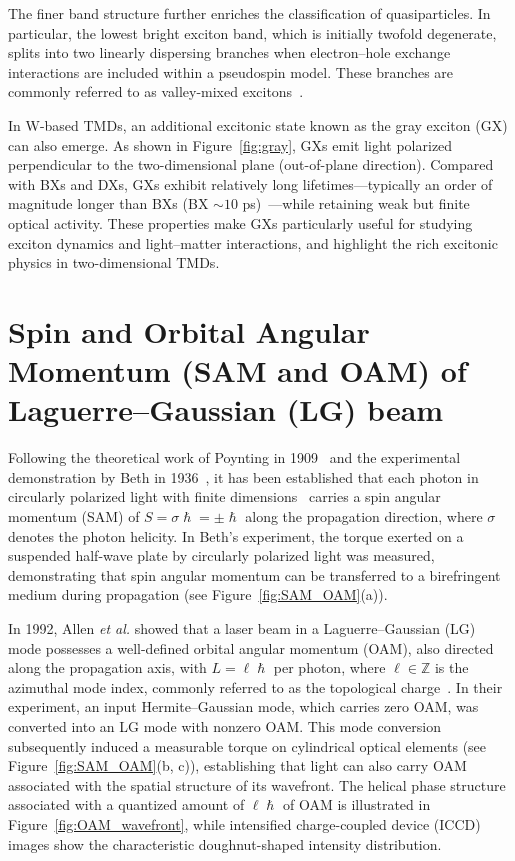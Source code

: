 The finer band structure further enriches the classification of quasiparticles. In particular, the lowest bright exciton band, which is initially twofold degenerate, splits into two linearly dispersing branches when electron–hole exchange interactions are included within a pseudospin model. These branches are commonly referred to as valley-mixed excitons~\cite{peng2022tailoring}. 

In W-based TMDs, an additional excitonic state known as the gray exciton (GX) can also emerge. As shown in Figure~\ref{fig:gray}, GXs emit light polarized perpendicular to the two-dimensional plane (out-of-plane direction). Compared with BXs and DXs, GXs exhibit relatively long lifetimes—typically an order of magnitude longer than BXs (BX $\sim 10$ ps)~\cite{schneider2020direct}—while retaining weak but finite optical activity. These properties make GXs particularly useful for studying exciton dynamics and light–matter interactions, and highlight the rich excitonic physics in two-dimensional TMDs.
%
%
%
%
%
%
%
\section{Spin and Orbital Angular Momentum (SAM and OAM) of Laguerre–Gaussian (LG) beam}

Following the theoretical work of Poynting in 1909~\cite{poynting1909angular} and the experimental demonstration by Beth in 1936~\cite{Beth1936Mechanical}, it has been established that each photon in circularly polarized light with finite dimensions~\cite{allen1992oam, jauch1976theory, forbes2024orbital} carries a spin angular momentum (SAM) of $S = \sigma\hslash = \pm \hslash$ along the propagation direction, where $\sigma$ denotes the photon helicity. In Beth's experiment, the torque exerted on a suspended half-wave plate by circularly polarized light was measured, demonstrating that spin angular momentum can be transferred to a birefringent medium during propagation (see Figure~\ref{fig:SAM_OAM}(a)).

In 1992, Allen \textit{et al.} showed that a laser beam in a Laguerre--Gaussian (LG) mode possesses a well-defined orbital angular momentum (OAM), also directed along the propagation axis, with $L=\ell\hslash$ per photon, where $\ell \in \mathbb{Z}$ is the azimuthal mode index, commonly referred to as the topological charge~\cite{allen1992oam}. In their experiment, an input Hermite--Gaussian mode, which carries zero OAM, was converted into an LG mode with nonzero OAM. This mode conversion subsequently induced a measurable torque on cylindrical optical elements (see Figure~\ref{fig:SAM_OAM}(b, c)), establishing that light can also carry OAM associated with the spatial structure of its wavefront. The helical phase structure associated with a quantized amount of $\ell\hslash$ of OAM is illustrated in Figure~\ref{fig:OAM_wavefront}, while intensified charge-coupled device (ICCD) images show the characteristic doughnut-shaped intensity distribution.

